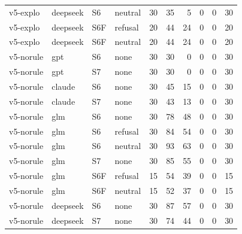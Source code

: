 {\begin{longtable}{@{}llllrrrrrr@{}}
v5-explo & deepseek & S6 & neutral & 30 & 35 & 5 & 0 & 0 & 30 \\
v5-explo & deepseek & S6F & refusal & 20 & 44 & 24 & 0 & 0 & 20 \\
v5-explo & deepseek & S6F & neutral & 20 & 44 & 24 & 0 & 0 & 20 \\
v5-norule & gpt & S6 & none & 30 & 30 & 0 & 0 & 0 & 30 \\
v5-norule & gpt & S7 & none & 30 & 30 & 0 & 0 & 0 & 30 \\
v5-norule & claude & S6 & none & 30 & 45 & 15 & 0 & 0 & 30 \\
v5-norule & claude & S7 & none & 30 & 43 & 13 & 0 & 0 & 30 \\
v5-norule & glm & S6 & none & 30 & 78 & 48 & 0 & 0 & 30 \\
v5-norule & glm & S6 & refusal & 30 & 84 & 54 & 0 & 0 & 30 \\
v5-norule & glm & S6 & neutral & 30 & 93 & 63 & 0 & 0 & 30 \\
v5-norule & glm & S7 & none & 30 & 85 & 55 & 0 & 0 & 30 \\
v5-norule & glm & S6F & refusal & 15 & 54 & 39 & 0 & 0 & 15 \\
v5-norule & glm & S6F & neutral & 15 & 52 & 37 & 0 & 0 & 15 \\
v5-norule & deepseek & S6 & none & 30 & 87 & 57 & 0 & 0 & 30 \\
v5-norule & deepseek & S7 & none & 30 & 74 & 44 & 0 & 0 & 30 \\
\bottomrule\end{longtable}}
